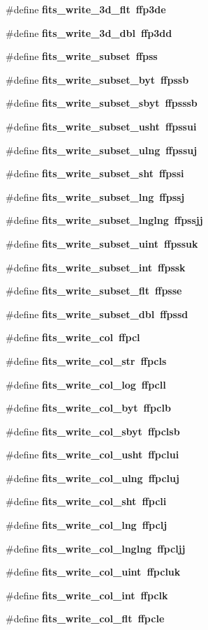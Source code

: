 \begin{CompactItemize}
\#define \bf{fits\_\-write\_\-3d\_\-flt}~ffp3de
\item 
\#define \bf{fits\_\-write\_\-3d\_\-dbl}~ffp3dd
\item 
\#define \bf{fits\_\-write\_\-subset}~ffpss
\item 
\#define \bf{fits\_\-write\_\-subset\_\-byt}~ffpssb
\item 
\#define \bf{fits\_\-write\_\-subset\_\-sbyt}~ffpsssb
\item 
\#define \bf{fits\_\-write\_\-subset\_\-usht}~ffpssui
\item 
\#define \bf{fits\_\-write\_\-subset\_\-ulng}~ffpssuj
\item 
\#define \bf{fits\_\-write\_\-subset\_\-sht}~ffpssi
\item 
\#define \bf{fits\_\-write\_\-subset\_\-lng}~ffpssj
\item 
\#define \bf{fits\_\-write\_\-subset\_\-lnglng}~ffpssjj
\item 
\#define \bf{fits\_\-write\_\-subset\_\-uint}~ffpssuk
\item 
\#define \bf{fits\_\-write\_\-subset\_\-int}~ffpssk
\item 
\#define \bf{fits\_\-write\_\-subset\_\-flt}~ffpsse
\item 
\#define \bf{fits\_\-write\_\-subset\_\-dbl}~ffpssd
\item 
\#define \bf{fits\_\-write\_\-col}~ffpcl
\item 
\#define \bf{fits\_\-write\_\-col\_\-str}~ffpcls
\item 
\#define \bf{fits\_\-write\_\-col\_\-log}~ffpcll
\item 
\#define \bf{fits\_\-write\_\-col\_\-byt}~ffpclb
\item 
\#define \bf{fits\_\-write\_\-col\_\-sbyt}~ffpclsb
\item 
\#define \bf{fits\_\-write\_\-col\_\-usht}~ffpclui
\item 
\#define \bf{fits\_\-write\_\-col\_\-ulng}~ffpcluj
\item 
\#define \bf{fits\_\-write\_\-col\_\-sht}~ffpcli
\item 
\#define \bf{fits\_\-write\_\-col\_\-lng}~ffpclj
\item 
\#define \bf{fits\_\-write\_\-col\_\-lnglng}~ffpcljj
\item 
\#define \bf{fits\_\-write\_\-col\_\-uint}~ffpcluk
\item 
\#define \bf{fits\_\-write\_\-col\_\-int}~ffpclk
\item 
\#define \bf{fits\_\-write\_\-col\_\-flt}~ffpcle
\item 

\end{CompactItemize}
